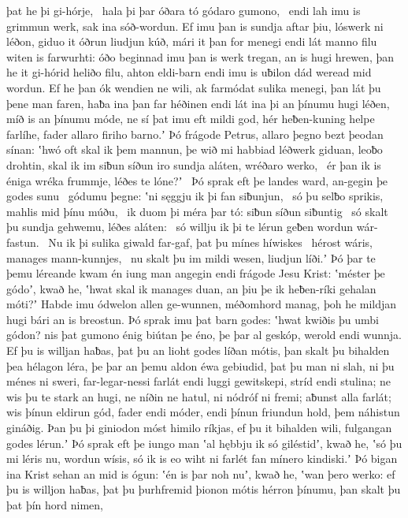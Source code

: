 þat he þi gi-hórje, \hld\ hala þi þar óðara tó
gódaro gumono, \hld\ endi lah imu is grimmun werk,
sak ina sóð-wordun. Ef imu þan is sundja aftar þiu,
lóswerk ni léðon, giduo it óðrun liudjun kúð,
mári it þan for menegi endi lát manno filu
witen is farwurhti: óðo beginnad imu þan is werk tregan,
an is hugi hrewen, þan he it gi-hórid heliðo filu,
ahton eldi-barn endi imu is uƀilon dád
weread mid wordun. Ef he þan ók wendien ne wili,
ak farmódat sulika menegi, þan lát þu þene man faren,
haƀa ina þan far héðinen endi lát ina þi an þínumu hugi léðen,
míð is an þínumu móde, ne sí þat imu eft mildi god,
hér heƀen-kuning helpe farlíhe,
fader allaro firiho barno.ʼ Þó frágode Petrus,
allaro þegno bezt þeodan sínan:
ʽhwó oft skal ik þem mannun, þe wið mi habbiad
léðwerk giduan, leoƀo drohtin,
skal ik im siƀun síðun iro sundja aláten,
wréðaro werko, \hld\ ér þan ik is éniga wréka frummje,
léðes te lóne?ʼ \hld\ Þó sprak eft þe landes ward,
an-gegin þe godes sunu \hld\ gódumu þegne:
ʽni sęggju ik þi fan siƀunjun, \hld\ só þu selƀo sprikis,
mahlis mid þínu múðu, \hld\ ik duom þi méra þar tó:
siƀun síðun siƀuntig \hld\ só skalt þu sundja gehwemu,
léðes aláten: \hld\ só willju ik þi te lérun geƀen
wordun wár-fastun. \hld\ Nu ik þi sulika giwald far-gaf,
þat þu mínes híwiskes \hld\ hérost wáris,
manages mann-kunnjes, \hld\ nu skalt þu im mildi wesen,
liudjun líði.ʼ Þó þar te þemu léreande kwam
én iung man angegin endi frágode Jesu Krist:
ʽméster þe gódoʼ, kwað he, ʽhwat skal ik manages duan,
an þiu þe ik heƀen-ríki gehalan móti?ʼ
Habde imu ódwelon allen ge-wunnen,
méðomhord manag, þoh he mildjan hugi
bári an is breostun. Þó sprak imu þat barn godes:
ʽhwat kwiðis þu umbi gódon? nis þat gumono énig
biútan þe éno, þe þar al geskóp,
werold endi wunnja. Ef þu is willjan haƀas,
þat þu an lioht godes líðan mótis,
þan skalt þu bihalden þea hélagon léra,
þe þar an þemu aldon éwa gebiudid,
þat þu man ni slah, ni þu ménes ni sweri,
far-legar-nessi farlát endi luggi gewitskepi,
stríd endi stulina; ne wis þu te stark an hugi,
ne níðin ne hatul, ni nódróf ni fremi;
aƀunst alla farlát; wis þínun eldirun gód,
fader endi móder, endi þínun friundun hold,
þem náhistun gináðig. Þan þu þi giniodon móst
himilo ríkjas, ef þu it bihalden wili,
fulgangan godes lérun.ʼ Þó sprak eft þe iungo man
ʽal hębbju ik só giléstidʼ, kwað he, ʽsó þu mi léris nu,
wordun wísis, só ik is eo wiht ni farlét
fan mínero kindiski.ʼ Þó bigan ina Krist sehan
an mid is ógun: ʽén is þar noh nuʼ, kwað he,
ʽwan þero werko: ef þu is willjon haƀas,
þat þu þurhfremid þionon mótis
hérron þínumu, þan skalt þu þat þín hord nimen,

